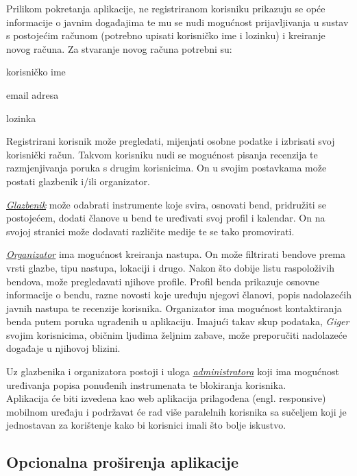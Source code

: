 		Prilikom pokretanja aplikacije, ne registriranom korisniku prikazuju se opće informacije o javnim događajima te mu se nudi mogućnost prijavljivanja u sustav s postojećim računom (potrebno upisati korisničko ime i lozinku) i kreiranje novog računa. Za stvaranje novog računa potrebni su: 
		
		\begin{packed_item}
			\item korisničko ime
			\item email adresa
			\item lozinka
		\end{packed_item}
	
		Registrirani korisnik može pregledati, mijenjati osobne podatke i izbrisati svoj korisnički račun. Takvom korisniku nudi se mogućnost pisanja recenzija te razmjenjivanja poruka s drugim korisnicima. On u svojim postavkama može postati glazbenik i/ili organizator.
		
		\textit{\underline{Glazbenik}} može odabrati instrumente koje svira, osnovati bend, pridružiti se postojećem, dodati članove u bend te uređivati svoj profil i kalendar. On na svojoj stranici može dodavati različite medije te se tako promovirati. 
		
		\textit{\underline{Organizator}} ima mogućnost kreiranja nastupa. On može filtrirati bendove prema vrsti glazbe, tipu nastupa, lokaciji i drugo. Nakon što dobije listu raspoloživih bendova, može pregledavati njihove profile. Profil benda prikazuje osnovne informacije o bendu, razne novosti koje uređuju njegovi članovi, popis nadolazećih javnih nastupa te recenzije korisnika. Organizator ima mogućnost kontaktiranja benda putem poruka ugrađenih u aplikaciju. Imajući takav skup podataka, \textit{Giger} svojim korisnicima, običnim ljudima željnim zabave, može preporučiti nadolazeće događaje u njihovoj blizini.
		
		Uz glazbenika i organizatora postoji i uloga \textit{\underline{administratora}} koji ima mogućnost uređivanja popisa ponuđenih instrumenata te blokiranja korisnika.
		\\
		
		Aplikacija će biti izvedena kao web aplikacija prilagođena (engl. responsive) mobilnom uređaju i podržavat će rad više paralelnih korisnika sa sučeljem koji je jednostavan za korištenje kako bi korisnici imali što bolje iskustvo.
		
		\subsection{Opcionalna proširenja aplikacije}
		
